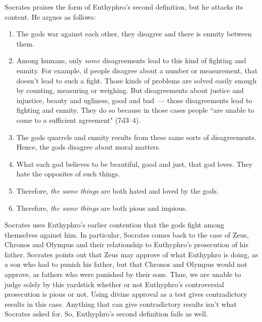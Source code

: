 \documentclass[12pt]{article}
\begin{document}
Socrates praises the form of Euthyphro's second definition, but he attacks its
content.  He argues as follows:

\begin{enumerate}

    \item The gods war against each other, they disagree and there is enmity
        between them.

    \item Among humans, only \emph{some} disagreements lead to this kind of
        fighting and enmity.  For example, if people disagree about a number or
        measurement, that doesn't lead to such a fight.  Those kinds of
        problems are solved easily enough by counting, measuring or weighing.
        But disagreements about justice and injustice, beauty and ugliness,
        good and bad~--- those disagreements lead to fighting and enmity.  They
        do so because in those cases people ``are unable to come to
        a sufficient agreement" (7d3--4).

    \item The gods quarrels and enmity results from these same sorts of
        disagreements.  Hence, the gods disagree about moral matters.

    \item What each god believes to be beautiful, good and just, that god
        loves.  They hate the opposites of such things.

    \item Therefore, \emph{the same things} are both hated and loved by the
        gods.

    \item Therefore, \emph{the same things} are both pious and impious.

\end{enumerate}


Socrates uses Euthyphro's earlier contention that the gods fight among
themselves against him.  In particular, Socrates comes back to the case of
Zeus, Chronos and Olympus and their relationship to Euthyphro's prosecution of
his father.  Socrates points out that Zeus may approve of what Euthyphro is
doing, as a son who had to punish his father, but that Chronos and Olympus
would not approve, as fathers who were punished by their sons.  Thus, we are
unable to judge solely by this yardstick whether or not Euthyphro's
controversial prosecution is pious or not.  Using divine approval as a test
gives contradictory results in this case.  Anything that can give contradictory
results isn't what Socrates asked for.  So, Euthyphro's second definition fails
as well.
\end{document}

